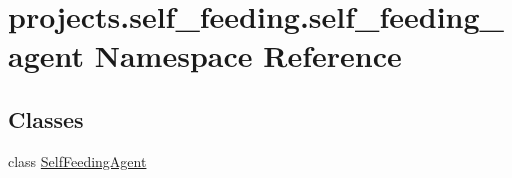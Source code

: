 \hypertarget{namespaceprojects_1_1self__feeding_1_1self__feeding__agent}{}\section{projects.\+self\+\_\+feeding.\+self\+\_\+feeding\+\_\+agent Namespace Reference}
\label{namespaceprojects_1_1self__feeding_1_1self__feeding__agent}
\subsection*{Classes}
\begin{DoxyCompactItemize}
\item 
class \hyperlink{classprojects_1_1self__feeding_1_1self__feeding__agent_1_1SelfFeedingAgent}{Self\+Feeding\+Agent}
\end{DoxyCompactItemize}
